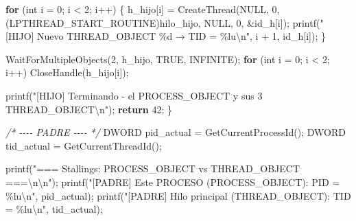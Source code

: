 \documentclass[
  spanish,
]{article}
\newenvironment{Shaded}{}{}
\newcommand{\CommentTok}[1]{\textcolor[rgb]{0.38,0.63,0.69}{\textit{#1}}}
\newcommand{\ControlFlowTok}[1]{\textcolor[rgb]{0.00,0.44,0.13}{\textbf{#1}}}
\newcommand{\DataTypeTok}[1]{\textcolor[rgb]{0.56,0.13,0.00}{#1}}
\newcommand{\DecValTok}[1]{\textcolor[rgb]{0.25,0.63,0.44}{#1}}
\newcommand{\NormalTok}[1]{#1}
\newcommand{\OperatorTok}[1]{\textcolor[rgb]{0.40,0.40,0.40}{#1}}
\newcommand{\SpecialCharTok}[1]{\textcolor[rgb]{0.25,0.44,0.63}{#1}}
\newcommand{\StringTok}[1]{\textcolor[rgb]{0.25,0.44,0.63}{#1}}
\begin{document}
\begin{Shaded}
\begin{Highlighting}[]
        \ControlFlowTok{for} \OperatorTok{(}\DataTypeTok{int}\NormalTok{ i }\OperatorTok{=} \DecValTok{0}\OperatorTok{;}\NormalTok{ i }\OperatorTok{\textless{}} \DecValTok{2}\OperatorTok{;}\NormalTok{ i}\OperatorTok{++)} \OperatorTok{\{}
\NormalTok{            h\_hijo}\OperatorTok{[}\NormalTok{i}\OperatorTok{]} \OperatorTok{=}\NormalTok{ CreateThread}\OperatorTok{(}\NormalTok{NULL}\OperatorTok{,} \DecValTok{0}\OperatorTok{,}
                \OperatorTok{(}\NormalTok{LPTHREAD\_START\_ROUTINE}\OperatorTok{)}\NormalTok{hilo\_hijo}\OperatorTok{,}\NormalTok{ NULL}\OperatorTok{,} \DecValTok{0}\OperatorTok{,} \OperatorTok{\&}\NormalTok{id\_h}\OperatorTok{[}\NormalTok{i}\OperatorTok{]);}
\NormalTok{            printf}\OperatorTok{(}\StringTok{"[HIJO]  Nuevo THREAD\_OBJECT }\SpecialCharTok{\%d}\StringTok{ → TID = }\SpecialCharTok{\%lu\textbackslash{}n}\StringTok{"}\OperatorTok{,}
\NormalTok{                   i }\OperatorTok{+} \DecValTok{1}\OperatorTok{,}\NormalTok{ id\_h}\OperatorTok{[}\NormalTok{i}\OperatorTok{]);}
        \OperatorTok{\}}

\NormalTok{        WaitForMultipleObjects}\OperatorTok{(}\DecValTok{2}\OperatorTok{,}\NormalTok{ h\_hijo}\OperatorTok{,}\NormalTok{ TRUE}\OperatorTok{,}\NormalTok{ INFINITE}\OperatorTok{);}
        \ControlFlowTok{for} \OperatorTok{(}\DataTypeTok{int}\NormalTok{ i }\OperatorTok{=} \DecValTok{0}\OperatorTok{;}\NormalTok{ i }\OperatorTok{\textless{}} \DecValTok{2}\OperatorTok{;}\NormalTok{ i}\OperatorTok{++)}\NormalTok{ CloseHandle}\OperatorTok{(}\NormalTok{h\_hijo}\OperatorTok{[}\NormalTok{i}\OperatorTok{]);}

\NormalTok{        printf}\OperatorTok{(}\StringTok{"[HIJO]  Terminando {-} el PROCESS\_OBJECT y sus 3 THREAD\_OBJECT}\SpecialCharTok{\textbackslash{}n}\StringTok{"}\OperatorTok{);}
        \ControlFlowTok{return} \DecValTok{42}\OperatorTok{;}
    \OperatorTok{\}}

    \CommentTok{/* {-}{-}{-}{-} PADRE {-}{-}{-}{-} */}
\NormalTok{    DWORD pid\_actual }\OperatorTok{=}\NormalTok{ GetCurrentProcessId}\OperatorTok{();}
\NormalTok{    DWORD tid\_actual }\OperatorTok{=}\NormalTok{ GetCurrentThreadId}\OperatorTok{();}

\NormalTok{    printf}\OperatorTok{(}\StringTok{"=== Stallings: PROCESS\_OBJECT vs THREAD\_OBJECT ===}\SpecialCharTok{\textbackslash{}n\textbackslash{}n}\StringTok{"}\OperatorTok{);}
\NormalTok{    printf}\OperatorTok{(}\StringTok{"[PADRE] Este PROCESO (PROCESS\_OBJECT): PID = }\SpecialCharTok{\%lu\textbackslash{}n}\StringTok{"}\OperatorTok{,}\NormalTok{ pid\_actual}\OperatorTok{);}
\NormalTok{    printf}\OperatorTok{(}\StringTok{"[PADRE]   Hilo principal (THREAD\_OBJECT): TID = }\SpecialCharTok{\%lu\textbackslash{}n}\StringTok{"}\OperatorTok{,}\NormalTok{ tid\_actual}\OperatorTok{);}


\end{Highlighting}
\end{Shaded}
\end{document}
